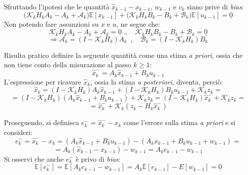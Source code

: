\documentclass[12pt,a4paper,openright,twoside]{book}
\begin{document}
Sfruttando l'ipotesi che le quantità $\hat{x}_{k-1}-x_{k-1}$, $w_{k-1}$ e $v_k$ siano prive di \textit{bias}:
$$\bigl(\mathcal{K}_kH_kA_k-A_k+\mathcal{A}_k\bigr)\mathbb{E}[x_{k-1}]+\bigl(\mathcal{K}_kH_kB_k-B_k+\mathcal{B}_k\bigr)\mathbb{E}[u_{k-1}]=\underline{0}$$
Non potendo fare assunzioni su $x$ e $u$, ne segue che:
$$\mathcal{K}_kH_kA_k-A_k+\mathcal{A}_k=\underline{0}\enspace,\quad\mathcal{K}_kH_kB_k-B_k+\mathcal{B}_k=\underline{0}$$
$$\Rightarrow\mathcal{A}_k=(I-\mathcal{K}_kH_k)A_k\enspace,\quad\mathcal{B}_k=(I-\mathcal{K}_kH_k)B_k$$

Risulta pratico definire la seguente quantità come una stima \textit{a priori}, ossia che non tiene conto della misurazione al passo $k\geq 1$:
$$\hat{x}_k^-=A_k\hat{x}_{k-1}+B_ku_{k-1}$$
L'espressione per ricavare $\hat{x}_k$, ossia la stima \textit{a posteriori}, diventa, perciò:
$$\hat{x}_k=(I-\mathcal{K}_kH_k)A_k\hat{x}_{k-1}+(I-\mathcal{K}_kH_k)B_ku_{k-1}+\mathcal{K}_kz_k=$$
$$=(I-\mathcal{K}_kH_k)(A_k\hat{x}_{k-1}+B_ku_{k-1})+\mathcal{K}_kz_k=(I-\mathcal{K}_kH_k)\hat{x}_k^-+\mathcal{K}_kz_k=$$
$$=\hat{x}_k^-+\mathcal{K}_k(z_k-H_k\hat{x}_k^-)$$

Proseguendo, si definisca $e_k^-=\hat{x}_k^--x_k$ come l'errore sulla stima \textit{a priori} e si consideri:
$$e_k^-=\hat{x}_k^--x_k=(A_k\hat{x}_{k-1}+B_ku_{k-1})-(A_kx_{k-1}+B_ku_{k-1}+w_{k-1})=$$
$$=A_k(\hat{x}_{k-1}-x_{k-1})-w_{k-1}=A_ke_{k-1}-w_{k-1}$$
Si osservi che anche $e_k^-$ è privo di \textit{bias}:
$$\mathbb{E}[e_k^-]=\mathbb{E}[A_ke_{k-1}-w_{k-1}]=A_k\mathbb{E}[e_{k-1}]-E[w_{k-1}]=\underline{0}$$
\end{document}

